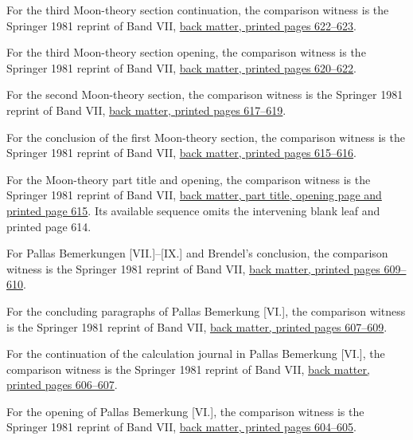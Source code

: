 For the third Moon-theory section continuation, the comparison witness is the Springer 1981 reprint of Band VII, \href{https://link.springer.com/content/pdf/bbm:978-3-642-92478-1/1}{back matter, printed pages 622--623}.



For the third Moon-theory section opening, the comparison witness is the Springer 1981 reprint of Band VII, \href{https://link.springer.com/content/pdf/bbm:978-3-642-92478-1/1}{back matter, printed pages 620--622}.



For the second Moon-theory section, the comparison witness is the Springer 1981 reprint of Band VII, \href{https://link.springer.com/content/pdf/bbm:978-3-642-92478-1/1}{back matter, printed pages 617--619}.



For the conclusion of the first Moon-theory section, the comparison witness is the Springer 1981 reprint of Band VII, \href{https://link.springer.com/content/pdf/bbm:978-3-642-92478-1/1}{back matter, printed pages 615--616}.



For the Moon-theory part title and opening, the comparison witness is the Springer 1981 reprint of Band VII, \href{https://link.springer.com/content/pdf/bbm:978-3-642-92478-1/1}{back matter, part title, opening page and printed page 615}. Its available sequence omits the intervening blank leaf and printed page 614.



For Pallas Bemerkungen [VII.]--[IX.] and Brendel’s conclusion, the comparison witness is the Springer 1981 reprint of Band VII, \href{https://link.springer.com/content/pdf/bbm:978-3-642-92478-1/1}{back matter, printed pages 609--610}.



For the concluding paragraphs of Pallas Bemerkung [VI.], the comparison witness is the Springer 1981 reprint of Band VII, \href{https://link.springer.com/content/pdf/bbm:978-3-642-92478-1/1}{back matter, printed pages 607--609}.



For the continuation of the calculation journal in Pallas Bemerkung [VI.], the comparison witness is the Springer 1981 reprint of Band VII, \href{https://link.springer.com/content/pdf/bbm:978-3-642-92478-1/1}{back matter, printed pages 606--607}.



For the opening of Pallas Bemerkung [VI.], the comparison witness is the Springer 1981 reprint of Band VII, \href{https://link.springer.com/content/pdf/bbm:978-3-642-92478-1/1}{back matter, printed pages 604--605}.



